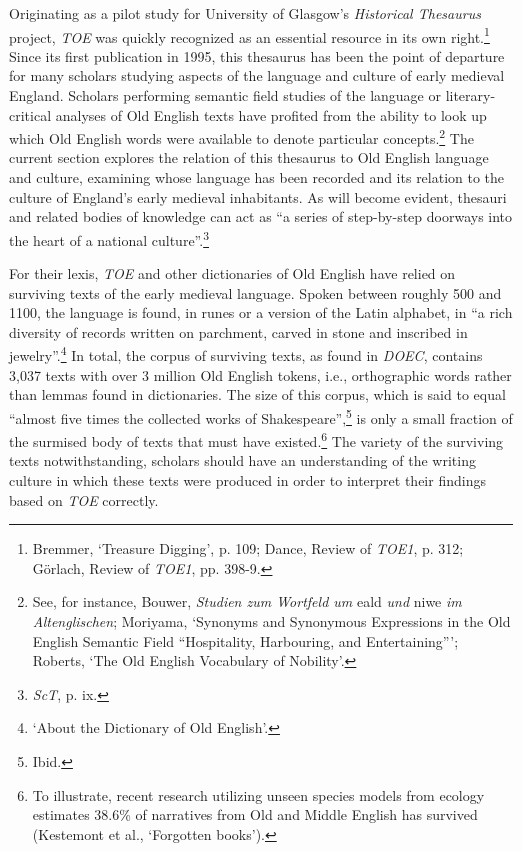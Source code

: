 Originating as a pilot study for University of Glasgow's \textit{Historical Thesaurus} project, \textit{TOE} was quickly recognized as an essential resource in its own right.\footnote{Bremmer, `Treasure Digging', p. 109; Dance, Review of \textit{TOE1}, p. 312; Görlach, Review of \textit{TOE1}, pp. 398-9.} Since its first publication in 1995, this thesaurus has been the point of departure for many scholars studying aspects of the language and culture of early medieval England. Scholars performing semantic field studies of the language or literary-critical analyses of Old English texts have profited from the ability to look up which Old English words were available to denote particular concepts.\footnote{See, for instance, Bouwer, \textit{Studien zum Wortfeld um} eald \textit{und} niwe \textit{im Altenglischen}; Moriyama, `Synonyms and Synonymous Expressions in the Old English Semantic Field ``Hospitality, Harbouring, and Entertaining'''; Roberts, `The Old English Vocabulary of Nobility'.} 
The current section explores the relation of this thesaurus to Old English language and culture, examining whose language has been recorded and its relation to the culture of England's early medieval inhabitants. %
As will become evident, thesauri and related bodies of knowledge can act as ``a series of step-by-step doorways into the heart of a national culture''.\footnote{\textit{ScT}, p. ix.} 

For their lexis, \textit{TOE} and other dictionaries of Old English have relied on surviving texts of the early medieval language. Spoken between roughly 500 and 1100, the language is found, in runes or a version of the Latin alphabet, in ``a rich diversity of records written on parchment, carved in stone and inscribed in jewelry''.\footnote{`About the Dictionary of Old English'.} In total, the corpus of surviving texts, as found in \textit{DOEC}, contains 3,037 texts with over 3 million Old English tokens, i.e., orthographic words rather than lemmas found in dictionaries. The size of this corpus, which is said to equal ``almost five times the collected works of Shakespeare'',\footnote{Ibid.} is only a small fraction of the surmised body of texts that must have existed.\footnote{To illustrate, recent research utilizing unseen species models from ecology estimates 38.6\% of narratives from Old and Middle English has survived (Kestemont et al., `Forgotten books').} %
The variety of the surviving texts notwithstanding, scholars should have an understanding of the writing culture in which these texts were produced in order to interpret their findings based on \textit{TOE} correctly.
%
%
%

